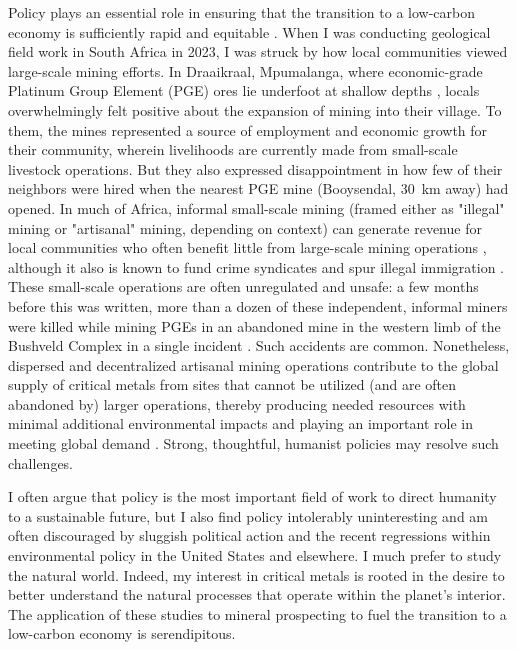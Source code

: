 Policy plays an essential role in ensuring that the transition to a low-carbon economy is sufficiently rapid and equitable \citep{sovacool2020}. 
When I was conducting geological field work in South Africa in 2023, I was struck by how local communities
viewed large-scale mining efforts. In Draaikraal, Mpumalanga, where economic-grade Platinum Group Element (PGE) ores lie underfoot at shallow 
depths \citep{vandermerwe2007}, 
locals overwhelmingly felt positive about the expansion of mining into their village. To them, the mines represented a source of employment 
and economic growth for their community, wherein livelihoods are currently made from small-scale livestock operations. 
But they also expressed disappointment in how few of their neighbors were hired when the nearest PGE mine (Booysendal, 30~km away) had opened. 
In much of Africa, informal small-scale mining (framed either as "illegal" mining or "artisanal" mining, depending on context) can generate revenue 
for local communities who often benefit little from large-scale mining operations \citep{sovacool2020}, although it also is known to fund 
crime syndicates and spur illegal immigration \citep{martin2019}. These small-scale operations are often unregulated and unsafe: a few months
before this was written, more than a dozen of these independent, informal miners were killed while mining PGEs in an abandoned mine in the 
western limb of the Bushveld Complex in a single incident \citep{ngcobo2026}. 
Such accidents are common. Nonetheless, dispersed and decentralized artisanal mining
operations contribute to the global supply of critical metals from sites that cannot be utilized (and are often abandoned by) larger operations, 
thereby producing needed resources with minimal additional environmental impacts and playing an important role in meeting global demand 
\citep{sovacool2020}. Strong, thoughtful, humanist policies may resolve such challenges. 

I often argue that policy is the most important field of work to direct humanity to a sustainable future, but I also find policy 
intolerably uninteresting and am often discouraged by sluggish political action and the recent regressions within environmental 
policy in the United States and elsewhere. I much prefer to study the natural world. Indeed, my interest in critical metals is rooted 
in the desire to better understand the natural processes that operate within the planet's interior. The application of these studies to 
mineral prospecting to fuel the transition to a low-carbon economy is serendipitous. 


